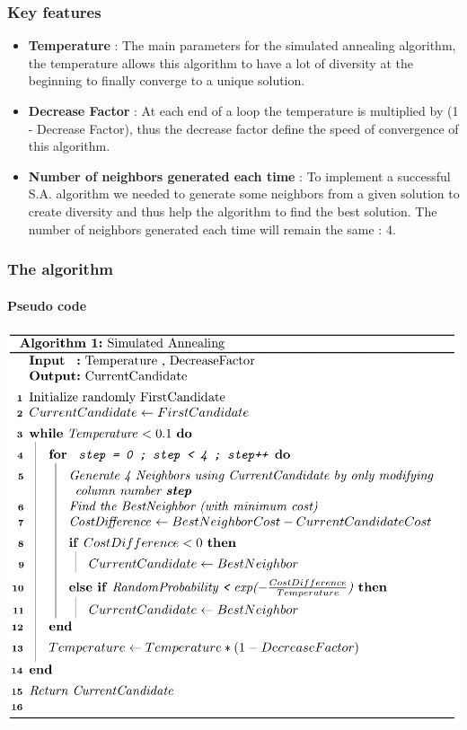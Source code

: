 \documentclass[11pt]{article}
\providecommand{\tightlist}{%
      \setlength{\itemsep}{0pt}\setlength{\parskip}{0pt}}
\begin{document}
\hypertarget{key-features}{%
\subsubsection{Key features}\label{key-features}}

\begin{itemize}
\tightlist
\item
  \textbf{Temperature} : The main parameters for the simulated annealing
  algorithm, the temperature allows this algorithm to have a lot of
  diversity at the beginning to finally converge to a unique solution.
\item
  \textbf{Decrease Factor} : At each end of a loop the temperature is
  multiplied by (1 - Decrease Factor), thus the decrease factor define
  the speed of convergence of this algorithm.
\item
  \textbf{Number of neighbors generated each time} : To implement a
  successful S.A. algorithm we needed to generate some neighbors from a
  given solution to create diversity and thus help the algorithm to find
  the best solution. The number of neighbors generated each time will
  remain the same : 4.
\end{itemize}

\hypertarget{the-algorithm}{%
\subsubsection{The algorithm}\label{the-algorithm}}

\hypertarget{pseudo-code}{%
\paragraph{Pseudo code}\label{pseudo-code}}

\begin{center}
\includegraphics{sa_algo}
\end{center}
\end{document}
